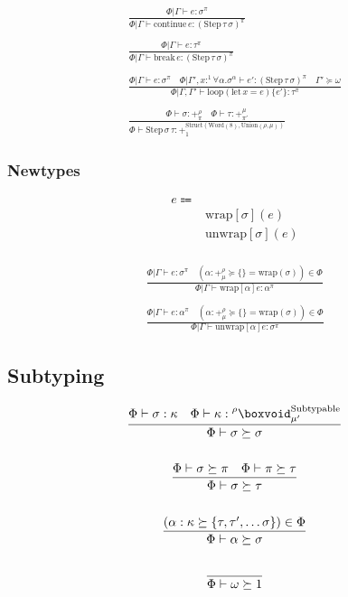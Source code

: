 \documentclass {article}
\begin{document}
\begin{gather*}
\frac
{\Phi | \Gamma \vdash e : \sigma^\pi }
{\Phi | \Gamma \vdash \text{continue} \, e : (\text{Step} \, \tau \, \sigma)^\pi } \\
\\
\frac
{\Phi | \Gamma \vdash e : \tau^\pi }
{\Phi | \Gamma \vdash \text{break} \, e : (\text{Step} \, \tau \, \sigma)^\pi } \\
\\
\frac
{\Phi | \Gamma \vdash e : \sigma^\pi \quad \Phi | \Gamma', x :^1 \forall \alpha. \sigma^\alpha \vdash e' : (\text{Step} \, \tau \, \sigma) ^\pi \quad \Gamma' \succeq \omega }
{\Phi | \Gamma, \Gamma' \vdash \text{loop} (\text{let} \, x = e) \{ e' \} : \tau^\pi } \\
\\
\frac
{\Phi \vdash \sigma : +^{\rho}_{\pi} \quad \Phi \vdash \tau : +^{\mu}_{\pi'} }
{\Phi \vdash \text{Step} \, \sigma \, \tau : +^{\text{Struct} (\text{Word} (8), \text{Union} (\rho, \mu) ) }_1 }
\end{gather*}

\subsubsection{Newtypes}

\begin{align*}
e \Coloneqq & \\
& \text{wrap} [\sigma] (e) \\
& \text{unwrap} [\sigma] (e) \\
\end{align*}

\begin{gather*}
\frac
{\Phi | \Gamma \vdash e : \sigma^\pi \quad (\alpha : +^\rho_\mu \succeq \{\} = \text{wrap} (\sigma)) \in \Phi}
{\Phi | \Gamma \vdash \text{wrap} [\alpha] e : \alpha^\pi} \\
\\
\frac
{\Phi | \Gamma \vdash e : \alpha^\pi \quad (\alpha : +^\rho_\mu \succeq \{\} = \text{wrap} (\sigma)) \in \Phi}
{\Phi | \Gamma \vdash \text{unwrap} [\alpha] e : \sigma^\pi}
\end{gather*}

\subsection{Subtyping}
\begin{gather*}
\frac
{\Phi \vdash \sigma : \kappa \quad \Phi \vdash \kappa : \prescript {\rho} {} \boxvoid^\text{Subtypable}_{\mu'}}
{\Phi \vdash \sigma \succeq \sigma} \\
\\
\frac
{\Phi \vdash \sigma \succeq \pi \quad \Phi \vdash \pi \succeq \tau}
{\Phi \vdash \sigma \succeq \tau} \\
\\
\frac
{(\alpha : \kappa \succeq  \{ \tau, \tau', \dots \sigma \}) \in \Phi }
{\Phi \vdash \alpha \succeq \sigma} \\
\\
\frac
{}
{\Phi \vdash \omega \succeq 1}
\end{gather*}
\end{document}
